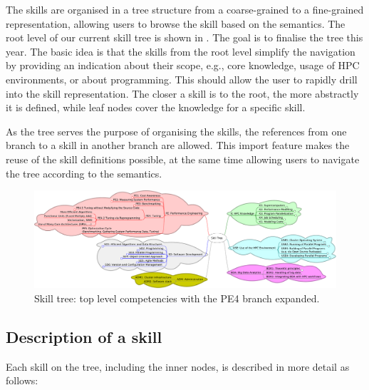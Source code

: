 \documentclass[jocse]{jocseart}
\begin{document}
The skills are organised in a tree structure from a coarse-grained to a fine-grained representation, allowing users to browse the skill based on the semantics.
The root level of our current skill tree is shown in . The goal is to finalise the tree this year.
The basic idea is that the skills from the root level simplify the navigation by providing an indication about their scope, e.g., core knowledge, usage of HPC environments, or about programming.
This should allow the user to rapidly drill into the skill representation.
The closer a skill is to the root, the more abstractly it is defined, while leaf nodes cover the knowledge for a specific skill.

As the tree serves the purpose of organising the skills, the references from one branch to a skill in another branch are allowed.
This import feature makes the reuse of the skill definitions possible, at the same time allowing users to navigate the tree according to the semantics.

\begin{figure}[tb!]
	\centering
	\includegraphics[width=15.0cm]{skill-tree}
	\caption{Skill tree: top level competencies with the PE4 branch expanded.}
	\label{fig:skill-tree}
\end{figure}

\subsection{Description of a skill}

Each skill on the tree, including the inner nodes, is described in more detail as follows:
\end{document}
